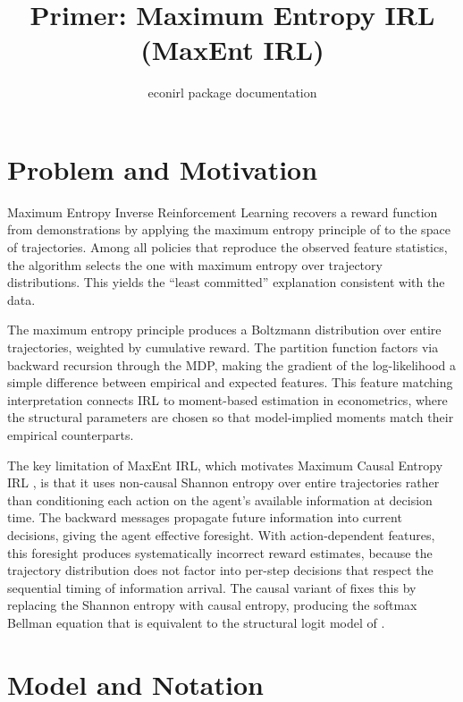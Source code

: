 \documentclass[10pt]{article}
\title{Primer: Maximum Entropy IRL (MaxEnt IRL)}
\author{econirl package documentation}
\date{}
\begin{document}
\maketitle


\section{Problem and Motivation}

Maximum Entropy Inverse Reinforcement Learning \citep{ziebart2008} recovers a reward function from demonstrations by applying the maximum entropy principle of \citet{jaynes1957} to the space of trajectories. Among all policies that reproduce the observed feature statistics, the algorithm selects the one with maximum entropy over trajectory distributions. This yields the ``least committed'' explanation consistent with the data.

The maximum entropy principle produces a Boltzmann distribution over entire trajectories, weighted by cumulative reward. The partition function factors via backward recursion through the MDP, making the gradient of the log-likelihood a simple difference between empirical and expected features. This feature matching interpretation connects IRL to moment-based estimation in econometrics, where the structural parameters are chosen so that model-implied moments match their empirical counterparts.

The key limitation of MaxEnt IRL, which motivates Maximum Causal Entropy IRL \citep{ziebart2010}, is that it uses non-causal Shannon entropy over entire trajectories rather than conditioning each action on the agent's available information at decision time. The backward messages propagate future information into current decisions, giving the agent effective foresight. With action-dependent features, this foresight produces systematically incorrect reward estimates, because the trajectory distribution does not factor into per-step decisions that respect the sequential timing of information arrival. The causal variant of \citet{ziebart2010} fixes this by replacing the Shannon entropy with causal entropy, producing the softmax Bellman equation that is equivalent to the structural logit model of \citet{rust1987}.


\section{Model and Notation}
\end{document}
